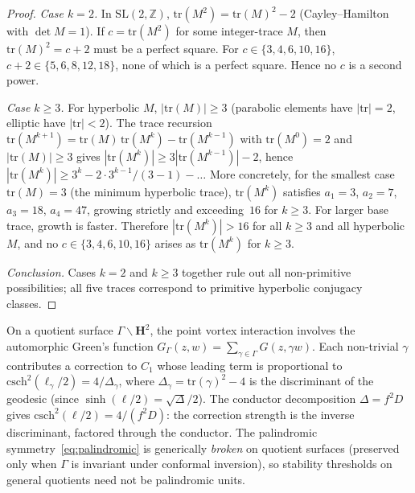 \begin{proof}
\emph{Case $k = 2$.}
In $\mathrm{SL}(2,\mathbb{Z})$,
$\mathrm{tr}(M^2) = \mathrm{tr}(M)^2 - 2$
(Cayley--Hamilton with $\det M = 1$).
If $c = \mathrm{tr}(M^2)$ for some integer-trace $M$,
then $\mathrm{tr}(M)^2 = c + 2$ must be a perfect square.
For $c \in \{3, 4, 6, 10, 16\}$, $c + 2 \in \{5, 6, 8, 12, 18\}$,
none of which is a perfect square.
Hence no $c$ is a second power.

\emph{Case $k \ge 3$.}
For hyperbolic $M$, $|\mathrm{tr}(M)| \ge 3$
(parabolic elements have $|\mathrm{tr}| = 2$, elliptic have
$|\mathrm{tr}| < 2$).
The trace recursion
$\mathrm{tr}(M^{k+1}) = \mathrm{tr}(M)\,\mathrm{tr}(M^k)
- \mathrm{tr}(M^{k-1})$
with $\mathrm{tr}(M^0) = 2$ and $|\mathrm{tr}(M)| \ge 3$
gives $|\mathrm{tr}(M^k)| \ge 3|\mathrm{tr}(M^{k-1})| - 2$,
hence $|\mathrm{tr}(M^k)| \ge 3^k - 2 \cdot 3^{k-1}/(3-1)
- \ldots$
More concretely, for the smallest case $\mathrm{tr}(M) = 3$
(the minimum hyperbolic trace),
$\mathrm{tr}(M^k)$ satisfies $a_1 = 3$, $a_2 = 7$, $a_3 = 18$,
$a_4 = 47$, growing strictly and exceeding~$16$ for $k \ge 3$.
For larger base trace, growth is faster.
Therefore $|\mathrm{tr}(M^k)| > 16$ for all $k \ge 3$ and all
hyperbolic~$M$, and no $c \in \{3, 4, 6, 10, 16\}$
arises as $\mathrm{tr}(M^k)$ for $k \ge 3$.

\emph{Conclusion.}
Cases $k = 2$ and $k \ge 3$ together rule out all
non-primitive possibilities; all five traces
correspond to primitive hyperbolic conjugacy classes.
\end{proof}

\begin{remark}
\label{rmk:automorphic-correction}
On a quotient surface $\Gamma\backslash\mathbf{H}^2$, the
point vortex interaction involves the automorphic Green's function
$G_\Gamma(z,w) = \sum_{\gamma \in \Gamma} G(z, \gamma w)$.
Each non-trivial $\gamma$ contributes a correction to $C_1$
whose leading term is proportional to
$\mathrm{csch}^2(\ell_\gamma/2) = 4/\Delta_\gamma$,
where $\Delta_\gamma = \mathrm{tr}(\gamma)^2 - 4$ is the
discriminant of the geodesic
(since $\sinh(\ell/2) = \sqrt{\Delta}/2$).
The conductor decomposition
$\Delta = f^2 D$ gives
$\mathrm{csch}^2(\ell/2) = 4/(f^2 D)$:
the correction strength is the inverse discriminant,
factored through the conductor.
The palindromic symmetry~\eqref{eq:palindromic} is generically
\emph{broken} on quotient surfaces (preserved only when $\Gamma$
is invariant under conformal inversion), so stability thresholds
on general quotients need not be palindromic units.
\end{remark}

